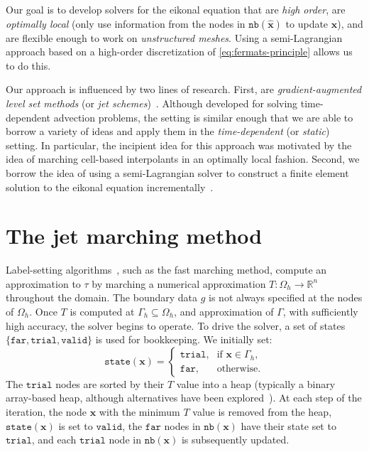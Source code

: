 \documentclass{siamart190516}
\newcommand{\m}[1]{\boldsymbol{#1}}
\newcommand{\nb}{\texttt{nb}}
\newcommand{\state}{\texttt{state}}
\newcommand{\valid}{\texttt{valid}}
\newcommand{\trial}{\texttt{trial}}
\newcommand{\far}{\texttt{far}}
\begin{document}
Our goal is to develop solvers for the eikonal equation that are
\emph{high order}, are \emph{optimally local} (only use information
from the nodes in $\nb(\hat{\m{x}})$ to update $\hat{\m{x}}$), and are
flexible enough to work on \emph{unstructured meshes}. Using a
semi-Lagrangian approach based on a high-order discretization of
\eqref{eq:fermats-principle} allows us to do this.

Our approach is influenced by two lines of research. First, are
\emph{gradient-augmented level set methods} (or \emph{jet
  schemes})~\cite{Nave:2010aa,Seibold:2011aa}. Although developed for
solving time-dependent advection problems, the setting is similar
enough that we are able to borrow a variety of ideas and apply them in
the \emph{time-dependent} (or \emph{static}) setting. In particular,
the incipient idea for this approach was motivated by the idea of
marching cell-based interpolants in an optimally local
fashion. Second, we borrow the idea of using a semi-Lagrangian solver
to construct a finite element solution to the eikonal equation
incrementally~\cite{Bornemann:2006aa}.

\section{The jet marching method}

Label-setting algorithms~\cite{Chacon:2012aa}, such as the fast
marching method, compute an approximation to $\tau$ by marching a
numerical approximation $T : \Omega_h \to \mathbb{R}^n$ throughout the
domain. The boundary data $g$ is not always specified at the nodes of
$\Omega_h$. Once $T$ is computed at $\Gamma_h \subseteq \Omega_h$, and
approximation of $\Gamma$, with sufficiently high accuracy, the solver
begins to operate. To drive the solver, a set of states
$\{\far,\trial,\valid\}$ is used for bookkeeping. We initially set:
\begin{equation}
  \state(\m{x}) = \begin{cases}
    \trial, & \mbox{if } \m{x} \in \Gamma_h, \\
    \far, & \mbox{otherwise.}
  \end{cases}
\end{equation}
The $\trial$ nodes are sorted by their $T$ value into a heap
(typically a binary array-based heap, although alternatives have been
explored~\cite{Gomez:2019aa}). At each step of the iteration, the node
$\m{x}$ with the minimum $T$ value is removed from the heap,
$\state(\m{x})$ is set to $\valid$, the $\far$ nodes in $\nb(\m{x})$
have their state set to $\trial$, and each $\trial$ node in
$\nb(\m{x})$ is subsequently updated.
\end{document}
